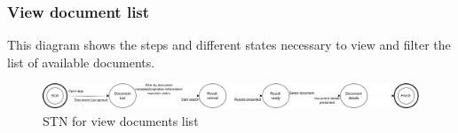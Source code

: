 \subsubsection{View document list}
This diagram shows the steps and different states necessary to view and filter the list of available documents.
\begin{figure}[H]
	\centering
	\includegraphics[width=\textwidth]{../Draw.io diagrams/document_search_STN.drawio.png}  %
	\caption{STN for view documents list}
\end{figure}
